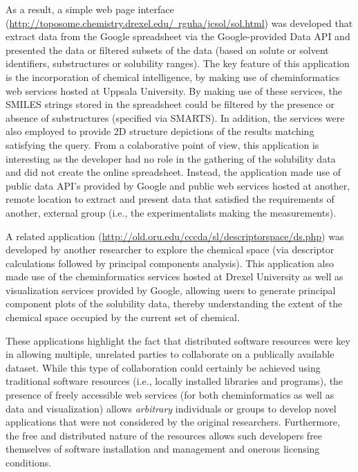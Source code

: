 \documentclass[12pt]{book}
\begin{document}
As a result, a simple web page interface
(\href{http://toposome.chemistry.drexel.edu/~rguha/jcsol/sol.html}{http://toposome.chemistry.drexel.edu/~rguha/jcsol/sol.html})
was developed that extract data from the Google spreadsheet via the
Google-provided Data API and presented the data or filtered subsets of
the data (based on solute or solvent identifiers, substructures or
solubility ranges). The key feature of this application is the
incorporation of chemical intelligence, by making use of
cheminformatics web services hosted at Uppsala University. By making
use of these services, the SMILES strings stored in the spreadsheet
could be filtered by the presence or absence of substructures
(specified via SMARTS). In addition, the services were also employed
to provide 2D structure depictions of the results matching satisfying
the query. From a colaborative point of view, this application is
interesting as the developer had no role in the gathering of the
solubility data and did not create the online spreadsheet. Instead,
the application made use of public data API's provided by Google and
public web services hosted at another, remote location to extract and
present data that satisfied the requirements of another, external
group (i.e., the experimentalists making the measurements).

A related application (\href{http://old.oru.edu/cccda/sl/descriptorspace/ds.php}{http://old.oru.edu/cccda/sl/descriptorspace/ds.php}) 
was developed by another researcher to
explore the chemical space (via descriptor calculations followed by
principal components analysis). This application also made use of the
cheminformatics services hosted at Drexel University as well as
visualization services provided by Google, allowing users to generate
principal component plots of the solubility data, thereby
understanding the extent of the chemical space occupied by the current
set of chemical.

These applications highlight the fact that distributed software
resources were key in allowing multiple, unrelated parties to
collaborate on a publically available dataset. While this type of
collaboration could certainly be achieved using traditional software
resources (i.e., locally installed libraries and programs), the
presence of freely accessible web services (for both cheminformatics
as well as data and visualization) allows \emph{arbitrary} individuals
or groups to develop novel applications that were not considered by
the original researchers. Furthermore, the free and distributed nature
of the resources allows such developers free themselves of software
installation and management and onerous licensing conditions.
\end{document}
